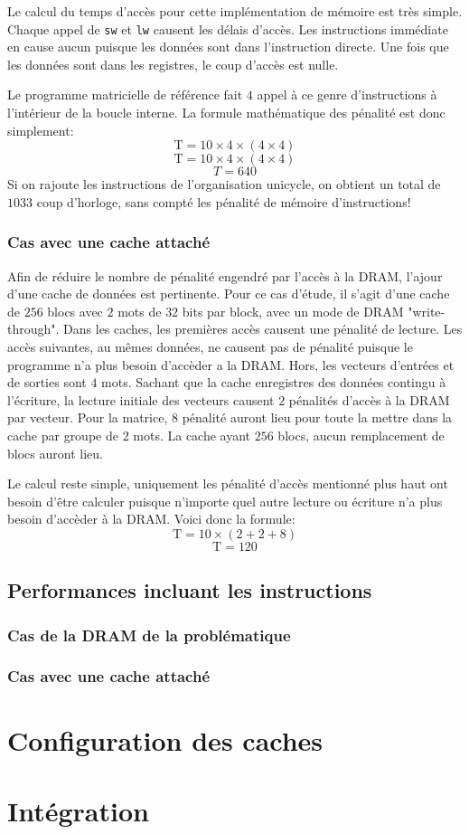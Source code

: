 \documentclass[a11paper]{article}
\begin{document}
Le calcul du temps d'accès pour cette implémentation de mémoire est très simple. Chaque appel de \verb|sw| et \verb|lw| causent les délais d'accès. Les instructions immédiate en
cause aucun puisque les données sont dans l'instruction directe. Une fois que les données sont dans les registres, le coup d'accès est nulle.

Le programme matricielle de référence fait $4$ appel à ce genre d'instructions à l'intérieur de la boucle interne. La formule mathématique des pénalité est donc simplement:
$$
\text{T} = 10\times4\times(4\times4)
$$
$$
\text{T} = 10\times4\times(4\times4)
$$
$$
T=640
$$
Si on rajoute les instructions de l'organisation unicycle, on obtient un total de $1033$ coup d'horloge, sans compté les pénalité de mémoire d'instructions!

\subsubsection{Cas avec une cache attaché}
Afin de réduire le nombre de pénalité engendré par l'accès à la DRAM, l'ajour d'une cache de données est pertinente. Pour ce cas d'étude, il s'agit d'une cache de $256$ blocs avec
$2$ mots de $32$ bits par block, avec un mode de DRAM "write-through". Dans les caches, les premières accès causent une pénalité de lecture. Les accès suivantes, au mêmes données,
ne causent pas de pénalité puisque le programme n'a plus besoin d'accèder a la DRAM. Hors, les vecteurs d'entrées et de sorties sont $4$ mots. Sachant que la cache enregistres des 
données contingu à l'écriture, la lecture initiale des vecteurs causent $2$ pénalités d'accès à la DRAM par vecteur. Pour la matrice, $8$ pénalité auront lieu pour toute la mettre
dans la cache par groupe de $2$ mots. La cache ayant $256$ blocs, aucun remplacement de blocs auront lieu.

Le calcul reste simple, uniquement les pénalité d'accès mentionné plus haut ont besoin d'être calculer puisque n'importe quel autre lecture ou écriture n'a plus besoin d'accèder à
la DRAM. Voici donc la formule:
$$
\text{T} = 10\times(2+2+8)
$$
$$
\text{T} = 120
$$

\subsection{Performances incluant les instructions}
\subsubsection{Cas de la DRAM de la problématique}

\subsubsection{Cas avec une cache attaché}



\section{Configuration des caches}

\section{Intégration}
\end{document}
